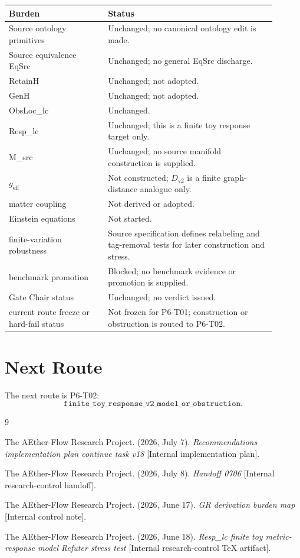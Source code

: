 \documentclass[11pt]{article}
\newcommand{\Dv}{D_{\mathrm{v2}}}
\newcommand{\GEff}{g_{\mathrm{eff}}}
\begin{document}
\begin{center}
\begin{tabular}{p{0.33\linewidth}p{0.57\linewidth}}
\hline
Burden & Status \\
\hline
Source ontology primitives & Unchanged; no canonical ontology edit is made. \\
Source equivalence EqSrc & Unchanged; no general EqSrc discharge. \\
RetainH & Unchanged; not adopted. \\
GenH & Unchanged; not adopted. \\
ObsLoc\_lc & Unchanged. \\
Resp\_lc & Unchanged; this is a finite toy response target only. \\
M\_src & Unchanged; no source manifold construction is supplied. \\
\(\GEff\) & Not constructed; \(\Dv\) is a finite graph-distance analogue only. \\
matter coupling & Not derived or adopted. \\
Einstein equations & Not started. \\
finite-variation robustness & Source specification defines relabeling and tag-removal tests for later construction and stress. \\
benchmark promotion & Blocked; no benchmark evidence or promotion is supplied. \\
Gate Chair status & Unchanged; no verdict issued. \\
current route freeze or hard-fail status & Not frozen for P6-T01; construction or obstruction is routed to P6-T02. \\
\hline
\end{tabular}
\end{center}

\section{Next Route}

The next route is P6-T02:
\[
  \texttt{finite\_toy\_response\_v2\_model\_or\_obstruction}.
\]

\begin{thebibliography}{9}

The AEther-Flow Research Project. (2026, July 7). \emph{Recommendations
implementation plan continue task v18} [Internal implementation plan].

The AEther-Flow Research Project. (2026, July 8). \emph{Handoff 0706}
[Internal research-control handoff].

The AEther-Flow Research Project. (2026, June 17). \emph{GR derivation
burden map} [Internal control note].

The AEther-Flow Research Project. (2026, June 18). \emph{Resp\_lc finite toy
metric-response model Refuter stress test} [Internal research-control TeX
artifact].

\end{thebibliography}
\end{document}
